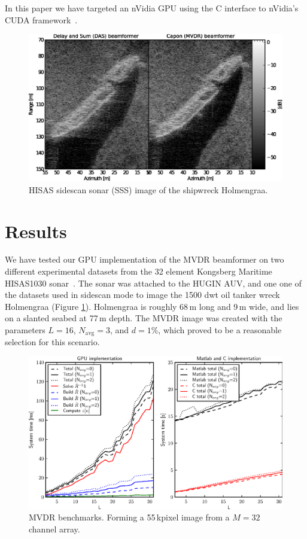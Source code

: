 \documentclass[12pt,journal,captionsoff,onecolumn]{IEEEtran}
\let\MYoriglatexcaption\caption               %
\renewcommand{\caption}[2][\relax]{\MYoriglatexcaption[#2]{#2}}
\newcommand\Fig[1]{Figure \ref{#1}}
\newcommand\1{\vec 1}
\begin{document}
In this paper we have targeted an nVidia \gls{GPU} using the C interface to nVidia's \gls{CUDA} framework~\cite{NvidiaCuda}.

\begin{figure}[!t]
\centering
\includegraphics[width=\linewidth]{gfx/img_holmengraa.ps}
\caption{HISAS sidescan sonar (SSS) image of the shipwreck Holmengraa.}\label{holmengraa}
\end{figure}


\section{Results}

We have tested our \gls{GPU} implementation of the \gls{MVDR} beamformer on two different experimental datasets from the 32 element Kongsberg Maritime HISAS1030 sonar~\cite{Hansen2009}. The sonar was attached to the HUGIN \gls{AUV}, and one one of the datasets used in sidescan mode to image the 1500 dwt oil tanker wreck Holmengraa (\Fig{holmengraa}). Holmengraa is roughly 68\,m long and 9\,m wide, and lies on a slanted seabed at 77\,m depth. The \gls{MVDR} image was created with the parameters $L=16$, $N_\text{avg}=3$, and $d=1\%$, which proved to be a reasonable selection for this scenario.

\begin{figure}[!t]
\centering
\includegraphics[width=\linewidth]{gfx/benchmark.ps}
\caption{\protect\gls{MVDR} benchmarks. Forming a 55\,kpixel image from a $M=32$ channel array.}\label{benchmarks}
\end{figure}
\end{document}
